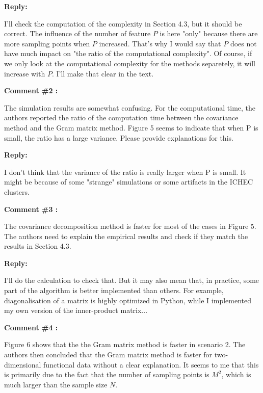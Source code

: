 \documentclass[11pt]{article}
\begin{document}
\textbf{Reply:} 

I'll check the computation of the complexity in Section 4.3, but it should be correct.
The influence of the number of feature $P$ is here "only" because there are more sampling points when $P$ increased. That's why I would say that $P$ does not have much impact on "the ratio of the computational complexity". Of course, if we only look at the computational complexity for the methods separetely, it will increase with $P$. I'll make that clear in the text.

\bigskip

\itshape


\textbf{Comment \#2 :}

The simulation results are somewhat confusing. For the computational time, the authors reported the ratio of the computation time between the covariance method and the Gram matrix method. Figure 5 seems to indicate that when P is small, the ratio has a large variance. Please provide explanations for this.

\medskip

\normalfont

\textbf{Reply:} 

I don't think that the variance of the ratio is really larger when P is small. It might be because of some "strange" simulations or some artifacts in the ICHEC clusters.

\bigskip

\itshape


\textbf{Comment \#3 :}

The covariance decomposition method is faster for most of the cases in Figure 5. The authors need to explain the empirical results and check if they match the results in Section 4.3.

\medskip

\normalfont

\textbf{Reply:} 

I'll do the calculation to check that. But it may also mean that, in practice, some part of the algorithm is better implemented than others. For example, diagonalisation of a matrix is highly optimized in Python, while I implemented my own version of the inner-product matrix...

\bigskip

\itshape


\textbf{Comment \#4 :}

Figure 6 shows that the the Gram matrix method is faster in scenario 2. The authors then concluded that the Gram matrix method is faster for two-dimensional functional data without a clear explanation. It seems to me that this is primarily due to the fact that the number of sampling points is $M^2$, which is much larger than the sample size $N$.
\end{document}
